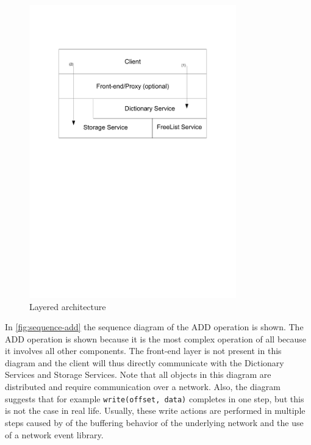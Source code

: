\documentclass[12pt,a4paper]{scrartcl}
\begin{document}
\begin{figure}[H]
\centering
\includegraphics[width=0.8\textwidth,trim=1cm 16cm 1cm 4cm,clip=true]{diagrams/layer-architecture.pdf}
\caption{Layered architecture}
\label{fig:layers}
\end{figure}

In \autoref{fig:sequence-add} the sequence diagram of the ADD operation is shown. The ADD operation is shown because it is the most complex operation of all because it involves all other components. The front-end layer is not present in this diagram and the client will thus directly communicate with the Dictionary Services and Storage Services. Note that all objects in this diagram are distributed and require communication over a network. Also, the diagram suggests that for example \verb|write(offset, data)| completes in one step, but this is not the case in real life. Usually, these write actions are performed in multiple steps caused by of the buffering behavior of the underlying network  and the use of a network event library.
\end{document}
